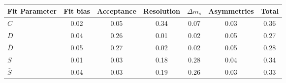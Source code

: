 \begin{tabular}{l  c  c  c  c  c  | c }
\hline
\hline
Fit Parameter & Fit bias & Acceptance & Resolution & $\Delta m_{s}$ & Asymmetries &  Total  \\ 
\hline
$C$ & 0.02 & 0.05 & 0.34 & 0.07 & 0.03 & 0.36 \\ 
$D$ & 0.04 & 0.26 & 0.01 & 0.02 & 0.05 & 0.27 \\ 
$\bar{D}$ & 0.05 & 0.27 & 0.02 & 0.02 & 0.05 & 0.28 \\ 
$S$ & 0.01 & 0.03 & 0.18 & 0.28 & 0.04 & 0.34 \\ 
$\bar{S}$ & 0.04 & 0.03 & 0.19 & 0.26 & 0.03 & 0.33 \\ 
\hline
\hline
\end{tabular}
